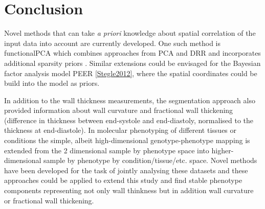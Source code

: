 \chapter{Conclusion}
Novel methods that can take \textit{a priori} knowledge about spatial correlation of the input data into account are currently developed. One such method is functionalPCA which combines approaches from PCA and DRR and incorporates additional sparsity priors \citep{Lila2016}. Similar extensions could be envisaged for the Bayesian factor analysis model PEER \cref{Stegle2012}, where the spatial coordinates could be build into the model as priors. 

In addition to the wall thickness measurements, the segmentation approach also provided information about wall curvature and fractional wall thickening (difference in thickness between end-systole and end-diastoly, normalised to the thickness at end-diastole). In molecular phenotyping of different tissues or conditions the simple, albeit high-dimensional genotype-phenotype mapping is extended from the \num{2} dimensional sample by phenotype space into higher-dimensional sample by phenotype by condition/tissue/etc. space. Novel methods have been developed for the task of jointly analysing these datasets \citep{Hore2016} and these approaches could be applied to extend this study and find stable phenotype components representing not only wall thinkness but in addition wall curvature or fractional wall thickening. 